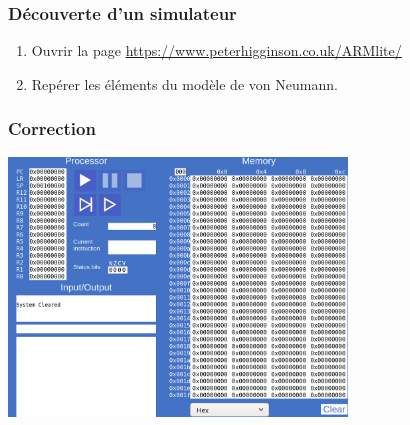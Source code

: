 \documentclass[svgnames,11pt]{beamer}
\begin{document}
\begin{frame}[fragile]
    \frametitle{Découverte d'un simulateur}

    \begin{activite}
        \begin{enumerate}
            \item Ouvrir la page \url{https://www.peterhigginson.co.uk/ARMlite/}
            \item Repérer les éléments du modèle de von Neumann.
        \end{enumerate}
    \end{activite}
\end{frame}
\begin{frame}
    \frametitle{Correction}

    \begin{center}
        \centering
        \includegraphics[width=9cm]{ressources/simulateur.png}
        \label{IMG}
    \end{center}

\end{frame}
\end{document}
